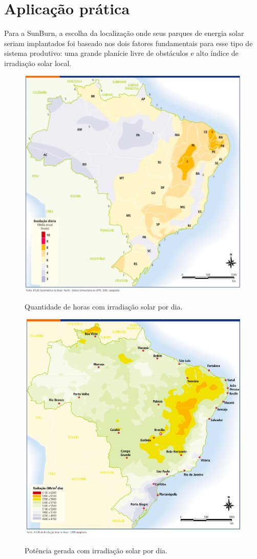 \section{Aplicação prática}
\label{sec:projetos_de_novas_aplicacao}


Para a SunBurn, a escolha da localização onde seus parques de energia solar seriam implantados foi baseado nos dois fatores fundamentais para esse tipo de sistema produtivo: uma grande planície livre de obstáculos e alto índice de irradiação solar local.

\begin{figure}[H]
    \centering
    \caption{Quantidade de horas com irradiação solar por dia.}
    \includegraphics[width=.6\textwidth]{images/insolacao_estudo.png}
    \label{fig:irradiacao_solar_h}
\end{figure}

\begin{figure}[H]
    \centering
    \caption{Potência gerada com irradiação solar por dia.}
    \includegraphics[width=.6\textwidth]{images/radiacao_solar_diaria.png}
    \label{fig:irradiacao_solar_mwh}
\end{figure}

